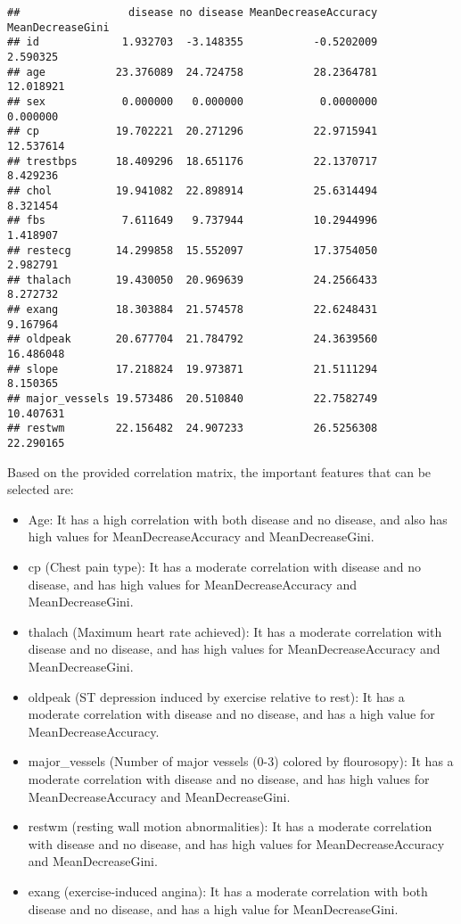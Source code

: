 \documentclass[
]{article}
\begin{document}
\begin{verbatim}
##                 disease no disease MeanDecreaseAccuracy MeanDecreaseGini
## id             1.932703  -3.148355           -0.5202009         2.590325
## age           23.376089  24.724758           28.2364781        12.018921
## sex            0.000000   0.000000            0.0000000         0.000000
## cp            19.702221  20.271296           22.9715941        12.537614
## trestbps      18.409296  18.651176           22.1370717         8.429236
## chol          19.941082  22.898914           25.6314494         8.321454
## fbs            7.611649   9.737944           10.2944996         1.418907
## restecg       14.299858  15.552097           17.3754050         2.982791
## thalach       19.430050  20.969639           24.2566433         8.272732
## exang         18.303884  21.574578           22.6248431         9.167964
## oldpeak       20.677704  21.784792           24.3639560        16.486048
## slope         17.218824  19.973871           21.5111294         8.150365
## major_vessels 19.573486  20.510840           22.7582749        10.407631
## restwm        22.156482  24.907233           26.5256308        22.290165
\end{verbatim}

Based on the provided correlation matrix, the important features that
can be selected are:

\begin{itemize}
\item
  Age: It has a high correlation with both disease and no disease, and
  also has high values for MeanDecreaseAccuracy and MeanDecreaseGini.
\item
  cp (Chest pain type): It has a moderate correlation with disease and
  no disease, and has high values for MeanDecreaseAccuracy and
  MeanDecreaseGini.
\item
  thalach (Maximum heart rate achieved): It has a moderate correlation
  with disease and no disease, and has high values for
  MeanDecreaseAccuracy and MeanDecreaseGini.
\item
  oldpeak (ST depression induced by exercise relative to rest): It has a
  moderate correlation with disease and no disease, and has a high value
  for MeanDecreaseAccuracy.
\item
  major\_vessels (Number of major vessels (0-3) colored by flourosopy):
  It has a moderate correlation with disease and no disease, and has
  high values for MeanDecreaseAccuracy and MeanDecreaseGini.
\item
  restwm (resting wall motion abnormalities): It has a moderate
  correlation with disease and no disease, and has high values for
  MeanDecreaseAccuracy and MeanDecreaseGini.
\item
  exang (exercise-induced angina): It has a moderate correlation with
  both disease and no disease, and has a high value for
  MeanDecreaseGini.
\end{itemize}
\end{document}
